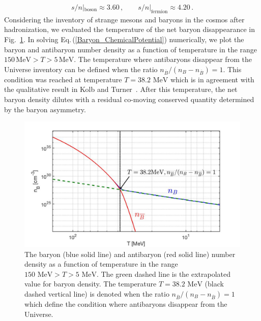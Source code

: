 \documentclass[universe,article,submit,moreauthors,pdftex,a4paper]{Definitions/mdpi}
\newcommand{\MeV}{\text{ MeV}}
\newcommand{\req}[1]{Eq.\,(\ref{#1})}
\newcommand*{\rf}[1]{Fig.~{\ref{#1}}}
\begin{document}
\begin{align}
s/n|_\mathrm{boson}\approx 3.60\,,\qquad
s/n|_\mathrm{fermion}\approx 4.20\,.
\end{align}
Considering the inventory of strange mesons and baryons in the cosmos after hadronization, we evaluated the temperature of the net baryon disappearance in \rf{Baryon_fig}. In solving \req{Baryon_ChemicalPotential} numerically, we plot the baryon and antibaryon number density as a function of temperature in the range $150\,\mathrm{MeV}>T>5\,\mathrm{MeV}$. The temperature where antibaryons disappear from the Universe inventory can be defined when the ratio $n_{\overline B}/(n_B-n_{\overline B})=1$. This condition was reached at temperature $T=38.2\MeV$ which is in agreement with the qualitative result in Kolb and Turner~\cite{kolb1990early}. After this temperature, the net baryon density dilutes with a residual co-moving conserved quantity determined by the baryon asymmetry.

\begin{figure}[ht]
\centering
\includegraphics[width=\textwidth]{./plots/Baryon_Antibaryon_cm.jpg}
\caption{The baryon (blue solid line) and antibaryon (red solid line) number density as a function of temperature in the range $150\MeV>T>5\MeV$. The green dashed line is the extrapolated value for baryon density. The temperature $T=38.2\MeV$ (black dashed vertical line) is denoted when the ratio $n_{\overline B}/(n_B-n_{\overline B})=1$ which define the condition where antibaryons disappear from the Universe.}
\label{Baryon_fig}
\end{figure}
\end{document}
